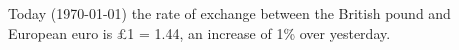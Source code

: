 \documentclass{article}
\begin{document}
Today (\today) the rate of exchange between the British pound
and European euro is \pounds 1 = \textsf{\texteuro}1.44, an
increase of 1\% over yesterday.
\end{document}
